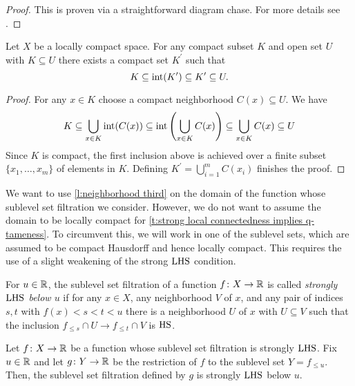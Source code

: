 \begin{proof}
	This is proven via a straightforward diagram chase.
For more details see \cite[Lemma II.17.3]{Bredon.1997}.
\end{proof}

\begin{lem} \label{l:neighborhood third}
	Let $X$ be a locally compact space.
	For any compact subset $K$ and open set $U$ with $K \subseteq U$ there exists a compact set $K^\prime$ such that
	\begin{equation*}
	K \subseteq \operatorname{int}(K^\prime) \subseteq K^\prime \subseteq U.
	\end{equation*}
\end{lem}

\begin{proof}
	For any $x \in K$ choose a compact neighborhood $C(x) \subseteq U$.
	We have
	\begin{equation*}
	K \subseteq \bigcup_{x \in K} \operatorname{int}(C(x)) \subseteq \operatorname{int}\left(\bigcup_{x \in K} C(x)\right) \subseteq \bigcup_{x \in K} C(x) \subseteq U
	\end{equation*}
	Since $K$ is compact, the first inclusion above is achieved over a finite subset $\{x_1, \dots, x_m\}$ of elements in $K$.
	Defining $K^\prime = \bigcup_{i=1}^m C(x_i)$ finishes the proof.
\end{proof}

We want to use \cref{l:neighborhood third} on the domain of the function whose sublevel set filtration we consider. However, we do not want to assume the domain to be locally compact for \cref{t:strong local connectedness implies q-tameness}. To circumvent this, we will work in one of the sublevel sets, which are assumed to be compact Hausdorff and hence locally compact. This requires the use of a slight weakening of the strong $\mathrm{LHS}$ condition.

\begin{defi}
	For $u \in \mathbb{R}$, the sublevel set filtration of a function $f \colon X \to \mathbb{R}$ is called \emph{strongly $\mathrm{LHS}$ below $u$} if for any $x \in X$, any neighborhood $V$ of $x$, and any pair of indices $s,t$ with $f(x) < s < t < u$ there is a neighborhood $U$ of $x$ with $U \subseteq V$ such that the inclusion $f_{\leq s} \cap U \to f_{\leq t} \cap V$ is $\mathrm{HS}$.
\end{defi}

\begin{lem}\label{l: restriction of LHS filtration}
    Let $f \colon X \to \mathbb{R}$ be a function whose sublevel set filtration is strongly $\mathrm{LHS}$.
    Fix $u \in \mathbb{R}$ and let $g \colon Y \to \mathbb{R}$ be the restriction of $f$ to the sublevel set $Y = f_{\leq u}$.
    Then, the sublevel set filtration defined by $g$ is strongly $\mathrm{LHS}$ below $u$.
\end{lem}

